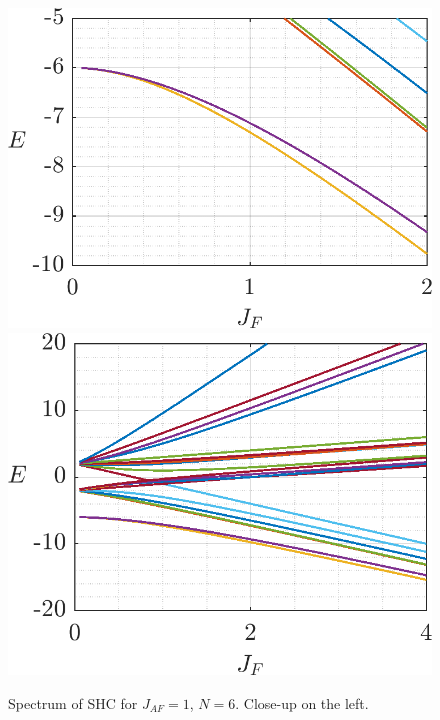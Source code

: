 \documentclass[12pt]{report}
\begin{document}
\begin{figure}
\includegraphics{Figures/Fig1b.png}
\includegraphics{Figures/Fig1a.png}
\caption{Spectrum of SHC for $J_{AF} = 1$, $N= 6$. Close-up on the left.}
\end{figure}
%
\end{document}
